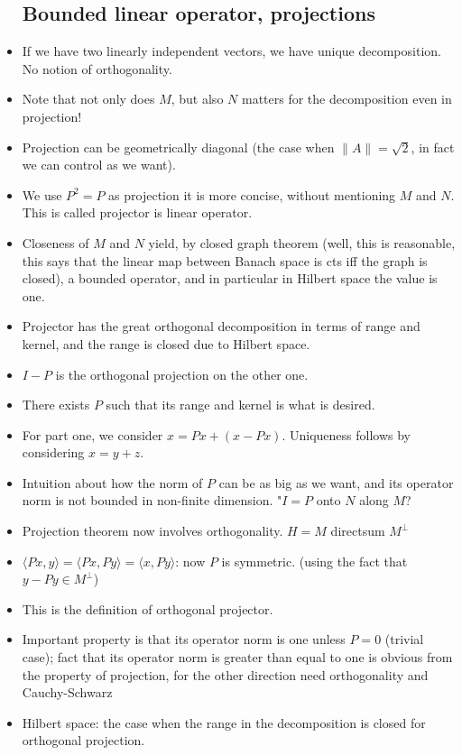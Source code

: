 \documentclass{article}
\theoremstyle{remark}
\begin{document}
\begin{itemize}
\subsection*{Bounded linear operator, projections}
\item If we have two linearly independent vectors, we have unique decomposition.
No notion of orthogonality.
\item Note that not only does $M$, but also $N$ matters for the decomposition even in projection!
\item Projection can be geometrically diagonal (the case when $\lVert A\rVert=\sqrt 2$, in fact we can control as we want).
\item We use $P^2=P$ as projection it is more concise, without mentioning $M$ and $N$. This is called projector is linear operator.
\item Closeness of $M$ and $N$ yield, by closed graph theorem (well, this is reasonable, this says that the linear map between Banach space is cts iff the graph is closed), a bounded operator, and in particular in Hilbert space the value is one.
\item Projector has the great orthogonal decomposition in terms of range and kernel, and the range is closed due to Hilbert space.
\item $I-P$ is the orthogonal projection on the other one.
\item There exists $P$ such that its range and kernel is what is desired.
\item For part one, we consider $x=Px+(x-Px)$. Uniqueness follows by considering $x=y+z$.
\item Intuition about how the norm of $P$ can be as big as we want, and its operator norm is not bounded in non-finite dimension. "$I=P$ onto $N$ along $M$?
\item Projection theorem now involves orthogonality. $H=M$ directsum $M^\perp$
\item $\langle Px,y\rangle=\langle Px,Py\rangle=\langle x,Py\rangle$: now $P$ is symmetric. (using the fact that $y-Py\in M^\perp$)
\item This is the definition of orthogonal projector.
\item Important property is that its operator norm is one unless $P=0$ (trivial case); fact that its operator norm is greater than equal to one is obvious from the property of projection, for the other direction need orthogonality and Cauchy-Schwarz
\item Hilbert space: the case when the range in the decomposition is closed for orthogonal projection.

\end{itemize}
\end{document}

